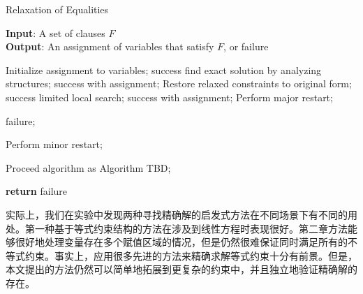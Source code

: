 \begin{algorithm}[t]
    \caption{Relaxation of Equalities}
    \label{alg:relaxation}
    \textbf{Input}: A set of clauses $F$ \\
    \textbf{Output}: An assignment of variables that satisfy $F$, or failure
    
    \begin{algorithmic}[1] %
        \Statex \hrulefill
        \STATE Initialize assignment to variables;
        \While {\top}
            \STATE success \leftarrow find exact solution by analyzing structures;
            \RETURN success with assignment;
            \ELSE
            \STATE Restore relaxed constraints to original form;
            \STATE success \leftarrow limited local search;
            \RETURN success with assignment;
            \ELSE
            \STATE Perform major restart;
            \ENDIF
            \ENDIF
            \ENDIF

            \RETURN failure;
            \ENDIF

            \STATE Perform minor restart;
            \ENDIF
            
            \STATE Proceed algorithm as Algorithm  TBD;
        \EndWhile

        \STATE \textbf{return} failure
    \end{algorithmic}
\end{algorithm}

实际上，我们在实验中发现两种寻找精确解的启发式方法在不同场景下有不同的用处。第一种基于等式约束结构的方法在涉及到线性方程时表现很好。第二章方法能够很好地处理变量存在多个赋值区域的情况，但是仍然很难保证同时满足所有的不等式约束。事实上，应用很多先进的方法来精确求解等式约束十分有前景\cite{CimattiGLS22, LiXZ23b}。但是，本文提出的方法仍然可以简单地拓展到更复杂的约束中，并且独立地验证精确解的存在。




